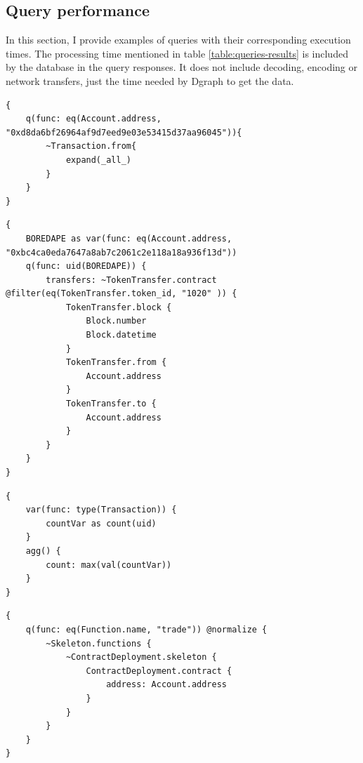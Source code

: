 \subsection{Query performance}

In this section, I provide examples of queries with their corresponding execution times. The processing time mentioned in table \cref{table:queries-results} is included by the database in the query responses. It does not include decoding, encoding or network transfers, just the time needed by Dgraph to get the data.

\begin{lstlisting}[caption={Query to get all the transactions sent by a specific address. Response included 1071 transactions.},label={lst:query-1},captionpos=b,numbers=none]
{
    q(func: eq(Account.address, "0xd8da6bf26964af9d7eed9e03e53415d37aa96045")){
        ~Transaction.from{
            expand(_all_)
        }
    }
}
\end{lstlisting}

\begin{lstlisting}[caption={Query to get all the transfers of BoredApe NFT with id \textit{1020} (686 transfers).},label={lst:query-2},captionpos=b,numbers=none]
{
    BOREDAPE as var(func: eq(Account.address, "0xbc4ca0eda7647a8ab7c2061c2e118a18a936f13d"))
	q(func: uid(BOREDAPE)) {
        transfers: ~TokenTransfer.contract @filter(eq(TokenTransfer.token_id, "1020" )) {
            TokenTransfer.block {
                Block.number
                Block.datetime
            }
            TokenTransfer.from {
                Account.address
            }
            TokenTransfer.to {
                Account.address
            }
        }
	}
}
\end{lstlisting}

\begin{lstlisting}[caption={Query to count all the transactions in the database.},label={lst:query-3},captionpos=b,numbers=none]
{
    var(func: type(Transaction)) {
        countVar as count(uid)
    }
    agg() {
        count: max(val(countVar))
    }
}
\end{lstlisting}

\begin{lstlisting}[caption={Query to get the addresses of contracts that implement a function with name \textit{trade} (554 addresses).},label={lst:query-4},captionpos=b,numbers=none]
{
    q(func: eq(Function.name, "trade")) @normalize {
        ~Skeleton.functions {
            ~ContractDeployment.skeleton {
                ContractDeployment.contract {
                    address: Account.address
                }
            }
        }
    }
}
\end{lstlisting}

